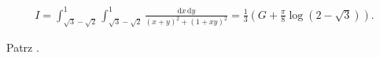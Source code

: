 %

\begin{problem_with_solution}
    \label{valean_1_44}%
    \begin{align}
        I = \int_{\sqrt{3} - \sqrt{2}}^1 \int_{\sqrt{3} - \sqrt{2}}^1 \frac{\mathrm{d}x \,\mathrm{d}y}{(x+y)^2 + (1+xy)^2} = \frac 1 3 \left(G + \frac \pi 8 \log (2 - \sqrt3)\right).
    \end{align} 
\end{problem_with_solution}

\begin{solution}
    Patrz \cite[s. ?????]{valean19}.
\end{solution}

%